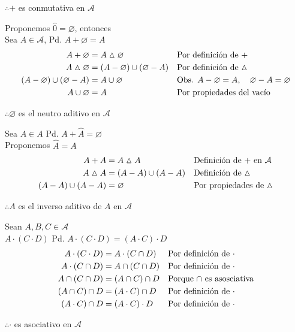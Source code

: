 \documentclass[letterpaper]{article}
\newcommand{\A}{\mathcal{A}}
\newcommand{\dsim}{\vartriangle}
\renewcommand{\*}{\cdot}
\theoremstyle{definition}
\begin{document}
\begin{center}
	$ \therefore + $ es conmutativa en $ \A $
\end{center}
Proponemos $ \hat{0} = \varnothing $, entonces\\
Sea $ A \in \A $, Pd. $ A + \varnothing = A $
\begin{align*}
	A + \varnothing &= A \dsim \varnothing && \text{Por definición de +}\\
	A \dsim \varnothing &= (A - \varnothing) \cup(\varnothing - A) && \text{Por definición de $ \dsim $}\\
	(A - \varnothing) \cup(\varnothing - A) &= A \cup \varnothing && \text{Obs. $ A - \varnothing = A,\quad \varnothing - A = \varnothing $}\\
	A \cup \varnothing &= A && \text{Por propiedades del vacío}
\end{align*}
\begin{center}
	$ \therefore \varnothing $ es el neutro aditivo en $ \A $
\end{center}
Sea $ A \in A $ Pd. $ A + \hat{A} = \varnothing $\\
Proponemos $ \hat{A} = A $
\begin{align*}
	A + A &= A\dsim A && \text{Definición de + en $ \A $}\\
	A \dsim A &= (A- A)\cup(A-A) && \text{Definición de $ \dsim $}\\
	(A- A)\cup(A-A) &= \varnothing && \text{Por propiedades de  $ \dsim $}\\
\end{align*}
\begin{center}
	$ \therefore A $ es el inverso aditivo de $ A $ en $ \A $
\end{center}
Sean $ A,B,C \in \A$\\
$ A \*( C \* D ) $ Pd. $  A \*( C \* D ) = (A \* C) \* D $
\begin{align*}
	A\*(C\*D) &= A\*(C \cap D) && \text{Por definición de $ \* $}\\
	A\*(C \cap D) &= A\cap(C \cap D) && \text{Por definición de $ \* $}\\
	A\cap(C \cap D) &= (A\cap C)\cap D && \text{Porque $ \cap $ es asosciativa}\\
	(A\cap C)\cap D &= (A \* C) \cap D && \text{Por definición de $ \* $}\\
	(A \* C) \cap D &= (A \* C)\* D  && \text{Por definición de $ \* $}\\
\end{align*}
\begin{center}
	$ \therefore \* $ es asociativo en $ \A $
\end{center}
\end{document}
